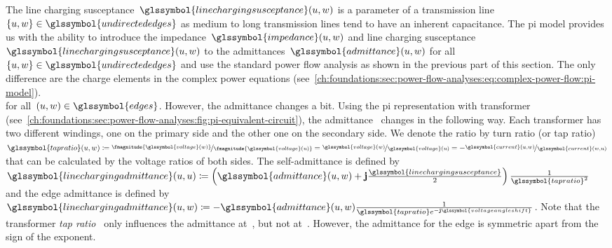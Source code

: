 The line charging
susceptance~$\glssymbol{linechargingsusceptance}(\vertexa,\vertexc)$ is a parameter of a
transmission line~$\{\vertexa,\vertexc\}\in\glssymbol{undirectededges}$ as
medium to long transmission lines tend to have an inherent capacitance. The pi
model provides us with the ability to introduce the
impedance~$\glssymbol{impedance}(\vertexa,\vertexc)$ and line charging
susceptance~$\glssymbol{linechargingsusceptance}(\vertexa,\vertexc)$ to the
admittances~$\glssymbol{admittance}(\vertexa,\vertexc)$ for all~$
\{\vertexa,\vertexc\}\in\glssymbol{undirectededges}$ and use the standard power
flow analysis as shown in the previous part of this section. The only difference
are the charge elements in the complex power equations
(see~\cref{ch:foundations:sec:power-flow-analyses:eq:complex-power-flow:pi-model}).
%
\begin{subequations}
    
    \label{ch:foundations:sec:power-flow-analyses:eq:complex-power-flow:pi-model}
\end{subequations}
% 
for all~$(\vertexa,\vertexc)\in\glssymbol{edges}$. However, the admittance
changes a bit. Using the pi representation with transformer
(see~\cref{ch:foundations:sec:power-flow-analyses:fig:pi-equivalent-circuit}),
the admittance~ changes in the following way. Each
transformer has two different windings, one on the primary side and the other
one on the secondary side. We denote the ratio by turn ratio (or tap
ratio)~$\glssymbol{tapratio}(\vertexa,\vertexc)\coloneqq\nicefrac{\fmagnitude{
\glssymbol{voltage}(\vertexc)}} {\fmagnitude{\glssymbol{voltage}(\vertexa)}} =
\nicefrac{\glssymbol{voltage}(\vertexc)}{\glssymbol{voltage} (\vertexa)} = -
\nicefrac{\glssymbol{current}(\vertexa, \vertexc)}{\glssymbol{current} (\vertexc, \vertexa)}$ that can
be calculated by the voltage ratios of both sides.
The self-admittance is defined by~$\glssymbol{linechargingadmittance}
(\vertexa,\vertexa)\coloneqq\left(\glssymbol{admittance}(\vertexa,\vertexc) +
\imgPart\frac{\glssymbol{linechargingsusceptance}}{2}\right)\frac{1}{\glssymbol{tapratio}^2}$
and the edge admittance is defined by~$\glssymbol{linechargingadmittance}
(\vertexa,\vertexc)\coloneqq -\glssymbol{admittance}
(\vertexa,\vertexc)\frac{1}{\glssymbol{tapratio}
e^{-\imgPart\glssymbol{voltageangleshift}} }$. Note that the transformer
\emph{tap ratio}~ only influences the admittance
at~\vertexa, but not at~\vertexc. However, the admittance for the edge is
symmetric apart from the sign of the exponent.

